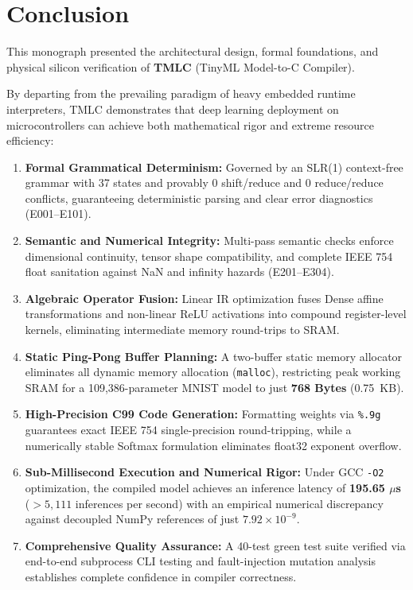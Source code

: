 \documentclass[11pt,a4paper]{article}
\begin{document}
\section{Conclusion}
\label{sec:conclusion}

This monograph presented the architectural design, formal foundations, and physical silicon verification of \textbf{TMLC} (TinyML Model-to-C Compiler). 

By departing from the prevailing paradigm of heavy embedded runtime interpreters, TMLC demonstrates that deep learning deployment on microcontrollers can achieve both mathematical rigor and extreme resource efficiency:
\begin{enumerate}
    \item \textbf{Formal Grammatical Determinism:} Governed by an SLR(1) context-free grammar with 37 states and provably 0 shift/reduce and 0 reduce/reduce conflicts, guaranteeing deterministic parsing and clear error diagnostics (E001--E101).
    \item \textbf{Semantic and Numerical Integrity:} Multi-pass semantic checks enforce dimensional continuity, tensor shape compatibility, and complete IEEE 754 float sanitation against NaN and infinity hazards (E201--E304).
    \item \textbf{Algebraic Operator Fusion:} Linear IR optimization fuses Dense affine transformations and non-linear ReLU activations into compound register-level kernels, eliminating intermediate memory round-trips to SRAM.
    \item \textbf{Static Ping-Pong Buffer Planning:} A two-buffer static memory allocator eliminates all dynamic memory allocation (\texttt{malloc}), restricting peak working SRAM for a 109,386-parameter MNIST model to just \textbf{768 Bytes} (0.75~KB).
    \item \textbf{High-Precision C99 Code Generation:} Formatting weights via \texttt{\%.9g} guarantees exact IEEE 754 single-precision round-tripping, while a numerically stable Softmax formulation eliminates float32 exponent overflow.
    \item \textbf{Sub-Millisecond Execution and Numerical Rigor:} Under GCC \texttt{-O2} optimization, the compiled model achieves an inference latency of \textbf{195.65 $\mu$s} ($>5,111$ inferences per second) with an empirical numerical discrepancy against decoupled NumPy references of just $7.92 \times 10^{-9}$.
    \item \textbf{Comprehensive Quality Assurance:} A 40-test green test suite verified via end-to-end subprocess CLI testing and fault-injection mutation analysis establishes complete confidence in compiler correctness.
\end{enumerate}
\end{document}
